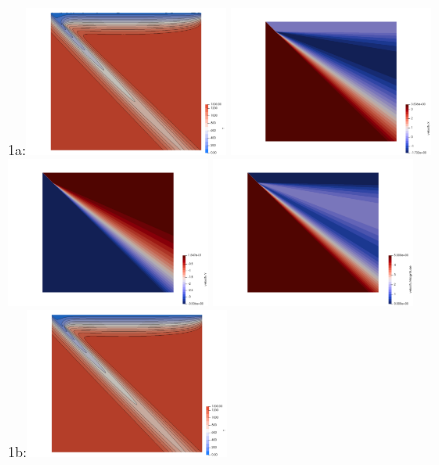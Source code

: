 \begin{landscape}
\begin{center}
1a:\includegraphics[width=5.3cm]{python_codes/fieldstone_68/results/case1a/T_1a}
\includegraphics[width=5.3cm]{python_codes/fieldstone_68/results/case1a/u_1a}
\includegraphics[width=5.3cm]{python_codes/fieldstone_68/results/case1a/v_1a}
\includegraphics[width=5.3cm]{python_codes/fieldstone_68/results/case1a/vel_1a}\\
1b:\includegraphics[width=5.3cm]{python_codes/fieldstone_68/results/case1b/T_1b}

\end{center}
\end{landscape}
